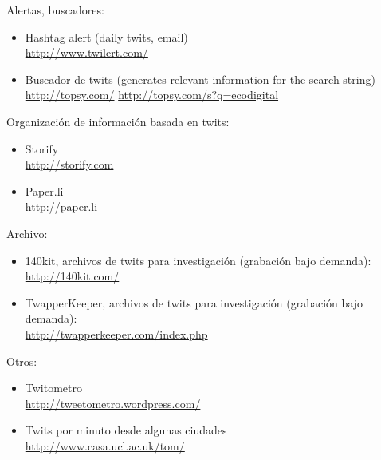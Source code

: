 \documentclass[a4paper,12pt]{article}
\begin{document}
Alertas, buscadores:

\begin{itemize}
\item Hashtag alert (daily twits, email) \\
  \url{http://www.twilert.com/}

\item Buscador de twits (generates relevant information for the search string) \\
  \url{http://topsy.com/} \url{http://topsy.com/s?q=ecodigital}
\end{itemize}

Organización de información basada en twits:

\begin{itemize}
\item Storify \\
  \url{http://storify.com}

\item Paper.li \\
  \url{http://paper.li}
\end{itemize}

Archivo:

\begin{itemize}
\item 140kit, archivos de twits para investigación (grabación bajo demanda): \\
  \url{http://140kit.com/}

\item TwapperKeeper, archivos de twits para investigación (grabación bajo demanda): \\
  \url{http://twapperkeeper.com/index.php}
\end{itemize}

Otros:

\begin{itemize}
\item Twitometro \\
  \url{http://tweetometro.wordpress.com/}

\item Twits por minuto desde algunas ciudades \\
  \url{http://www.casa.ucl.ac.uk/tom/}
\end{itemize}

\end{document}
